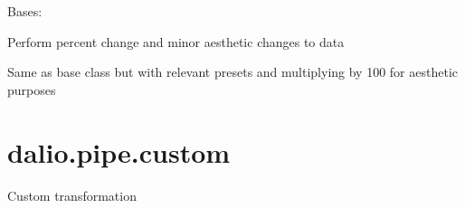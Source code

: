 \documentclass[letterpaper,10pt,english]{sphinxmanual}
\begin{document}

\begin{fulllineitems}
\label{\detokenize{dalio.pipe:dalio.pipe.col_generation.StockReturns}}
Bases: {\hyperref[\detokenize{dalio.pipe:dalio.pipe.col_generation.Change}]{}}

Perform percent change and minor aesthetic changes to data

\begin{fulllineitems}
\label{\detokenize{dalio.pipe:dalio.pipe.col_generation.StockReturns.transform}}
Same as base class but with relevant presets and multiplying by
100 for aesthetic purposes

\end{fulllineitems}


\end{fulllineitems}



\section{dalio.pipe.custom}
\label{\detokenize{dalio.pipe:module-dalio.pipe.custom}}\label{\detokenize{dalio.pipe:dalio-pipe-custom}}
Custom transformation
\end{document}
